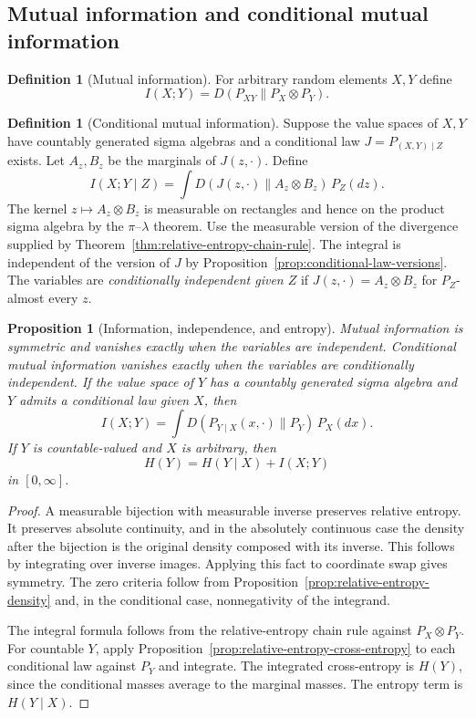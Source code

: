 \documentclass[11pt,oneside]{book}
\newtheorem{proposition}[theorem]{Proposition}
\theoremstyle{definition}
\newtheorem{definition}[theorem]{Definition}
\theoremstyle{remark}
\begin{document}
\subsection{Mutual information and conditional mutual information}
\label{subsec:mutual-information}

\begin{definition}[Mutual information]
\label{def:mutual-information}
For arbitrary random elements $X,Y$ define
\[
I(X;Y)=D(P_{XY}\|P_X\otimes P_Y).
\]
\end{definition}

\begin{definition}[Conditional mutual information]
\label{def:conditional-mutual-information}
Suppose the value spaces of $X,Y$ have countably generated sigma algebras
and a conditional law $J=P_{(X,Y)\mid Z}$ exists. Let $A_z,B_z$ be the
marginals of $J(z,\cdot)$. Define
\[
I(X;Y\mid Z)=\int D(J(z,\cdot)\|A_z\otimes B_z)\,P_Z(dz).
\]
The kernel $z\mapsto A_z\otimes B_z$ is measurable on rectangles and
hence on the product sigma algebra by the $\pi$--$\lambda$ theorem.
Use the measurable version of the divergence supplied by
Theorem~\ref{thm:relative-entropy-chain-rule}. The integral is
independent of the version of $J$ by
Proposition~\ref{prop:conditional-law-versions}.
The variables are \emph{conditionally independent given $Z$} if
$J(z,\cdot)=A_z\otimes B_z$ for $P_Z$-almost every $z$.
\end{definition}

\begin{proposition}[Information, independence, and entropy]
\label{prop:mutual-information-entropy}
Mutual information is symmetric and vanishes exactly when the
variables are independent. Conditional mutual information vanishes
exactly when the variables are conditionally independent.
If the value space of $Y$ has a countably generated sigma algebra
and $Y$ admits a conditional law given $X$, then
\[
I(X;Y)=\int D(P_{Y\mid X}(x,\cdot)\|P_Y)\,P_X(dx).
\]
If $Y$ is countable-valued and $X$ is arbitrary, then
\[
H(Y)=H(Y\mid X)+I(X;Y)
\]
in $[0,\infty]$.
\end{proposition}
\begin{proof}
A measurable bijection with measurable inverse preserves relative
entropy. It preserves absolute continuity, and in the absolutely
continuous case the density after the bijection is the original
density composed with its inverse. This follows by integrating over
inverse images. Applying this fact to coordinate swap gives symmetry.
The zero criteria follow from Proposition~\ref{prop:relative-entropy-density}
and, in the conditional case, nonnegativity of the integrand.

The integral formula follows from the relative-entropy chain rule
against $P_X\otimes P_Y$. For countable $Y$, apply Proposition~\ref{prop:relative-entropy-cross-entropy} to each
conditional law against $P_Y$ and integrate. The integrated
cross-entropy is $H(Y)$, since the conditional masses average to
the marginal masses. The entropy term is $H(Y\mid X)$.
\end{proof}
\end{document}
